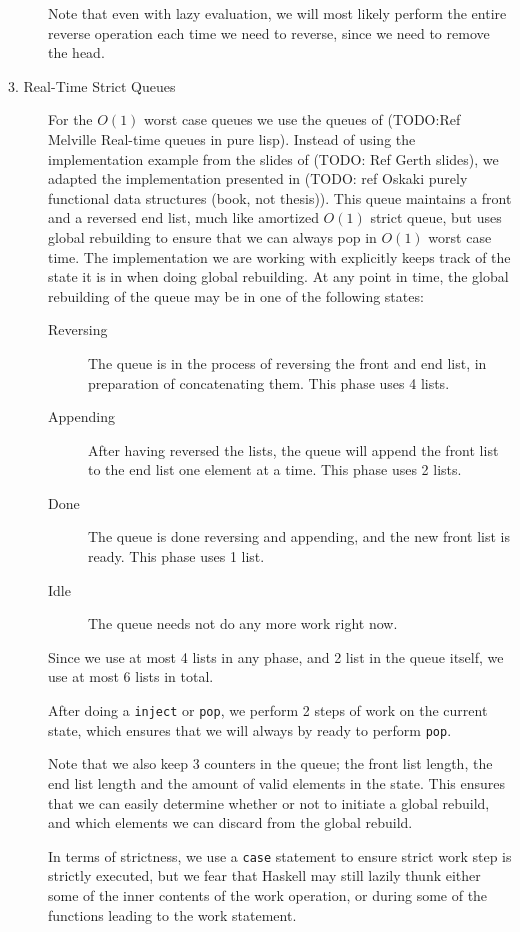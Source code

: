 \begin{description}
Note that even with lazy evaluation, we will most likely perform the entire reverse operation each time we need to reverse, since we need to remove the head.

\item[3. Real-Time Strict Queues] 
For the $O(1)$ worst case queues we use the queues of (TODO:Ref Melville Real-time queues in pure lisp). Instead of using the implementation example from the slides of (TODO: Ref Gerth slides), we adapted the implementation presented in (TODO: ref Oskaki purely functional data structures (book, not thesis)). This queue maintains a front and a reversed end list, much like amortized $O(1)$ strict queue, but uses global rebuilding to ensure that we can always pop in $O(1)$ worst case time. The implementation we are working with explicitly keeps track of the state it is in when doing global rebuilding. At any point in time, the global rebuilding of the queue may be in one of the following states:
\begin{description}
\item[Reversing] The queue is in the process of reversing the front and end list, in preparation of concatenating them. This phase uses 4 lists.
\item[Appending] After having reversed the lists, the queue will append the front list to the end list one element at a time. This phase uses 2 lists.
\item[Done] The queue is done reversing and appending, and the new front list is ready. This phase uses 1 list.
\item[Idle] The queue needs not do any more work right now.
\end{description}

Since we use at most 4 lists in any phase, and 2 list in the queue itself, we use at most 6 lists in total.

After doing a \texttt{inject} or \texttt{pop}, we perform 2 steps of work on the current state, which ensures that we will always by ready to perform \texttt{pop}.

Note that we also keep 3 counters in the queue; the front list length, the end list length and the amount of valid elements in the state. This ensures that we can easily determine whether or not to initiate a global rebuild, and which elements we can discard from the global rebuild.

In terms of strictness, we use a \texttt{case} statement to ensure strict work step is strictly executed, but we fear that Haskell may still lazily thunk either some of the inner contents of the work operation, or during some of the functions leading to the work statement.


\end{description}
